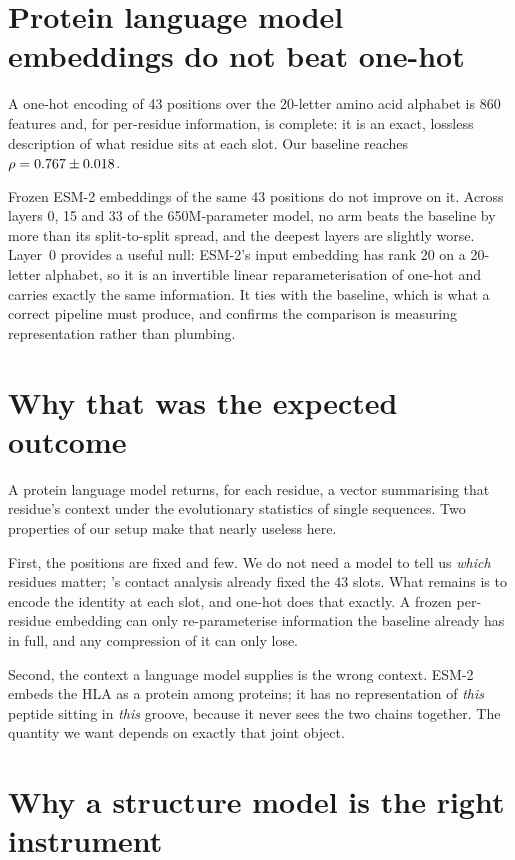\documentclass[11pt,a4paper]{article}
\begin{document}
\section{Protein language model embeddings do not beat one-hot}
\label{sec:plm}

A one-hot encoding of 43 positions over the 20-letter amino acid alphabet is
860 features and, for per-residue information, is complete: it is an exact,
lossless description of what residue sits at each slot. Our baseline reaches
$\rho = 0.767{} \pm 0.018{}$.

Frozen ESM-2 \citep{lin2023} embeddings of the same 43 positions do not improve
on it. Across layers 0, 15 and 33 of the 650M-parameter model, no arm beats the
baseline by more than its split-to-split spread, and the deepest layers are
slightly worse. Layer~0 provides a useful null: ESM-2's input embedding has rank
20 on a 20-letter alphabet, so it is an invertible linear reparameterisation of
one-hot and carries exactly the same information. It ties with the baseline,
which is what a correct pipeline must produce, and confirms the comparison is
measuring representation rather than plumbing.

\section{Why that was the expected outcome}
\label{sec:expected}

A protein language model returns, for each residue, a vector summarising that
residue's context under the evolutionary statistics of single sequences. Two
properties of our setup make that nearly useless here.

First, the positions are fixed and few. We do not need a model to tell us
\emph{which} residues matter; \citet{reynisson2020}'s contact analysis already
fixed the 43 slots. What remains is to encode the identity at each slot, and
one-hot does that exactly. A frozen per-residue embedding can only
re-parameterise information the baseline already has in full, and any
compression of it can only lose.

Second, the context a language model supplies is the wrong context. ESM-2
embeds the HLA as a protein among proteins; it has no representation of
\emph{this} peptide sitting in \emph{this} groove, because it never sees the two
chains together. The quantity we want depends on exactly that joint object.

\section{Why a structure model is the right instrument}
\label{sec:boltz}
\end{document}
